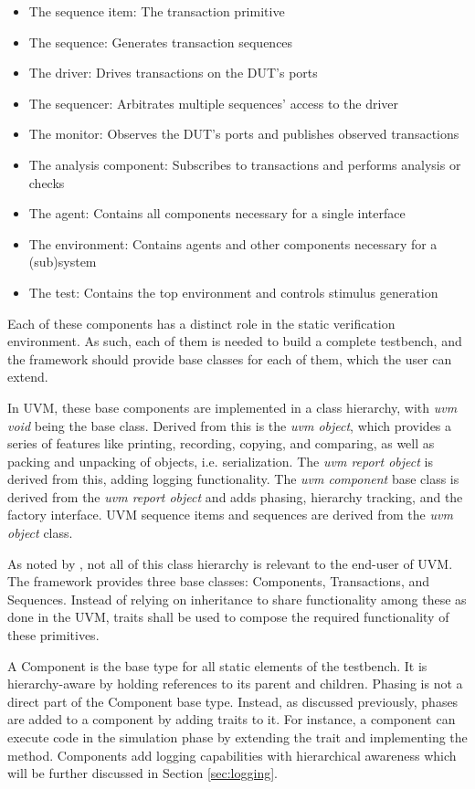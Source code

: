 \begin{itemize}
  \item The sequence item: The transaction primitive
  \item The sequence: Generates transaction sequences
  \item The driver: Drives transactions on the DUT's ports
  \item The sequencer: Arbitrates multiple sequences' access to the driver
  \item The monitor: Observes the DUT's ports and publishes observed transactions
  \item The analysis component: Subscribes to transactions and performs analysis or checks
  \item The agent: Contains all components necessary for a single interface
  \item The environment: Contains agents and other components necessary for a (sub)system
  \item The test: Contains the top environment and controls stimulus generation
\end{itemize}

Each of these components has a distinct role in the static verification environment. As such, each of them is needed to build a complete testbench, and the framework should
provide base classes for each of them, which the user can extend.

In UVM, these base components are implemented in a class hierarchy, with \textit{uvm void} being the base class. Derived
from this is the \textit{uvm object}, which provides a series of features like printing, recording, copying, and comparing,
as well as packing and unpacking of objects, i.e. serialization. The \textit{uvm report object} is derived from
this, adding logging functionality. The \textit{uvm component} base class is derived from the \textit{uvm report
object} and adds phasing, hierarchy tracking, and the factory interface. UVM sequence items and sequences are derived
from the \textit{uvm object} class.

As noted by \citeauthor{sutherland2015uvm} \cite{sutherland2015uvm}, not all of this class hierarchy is relevant to
the end-user of UVM. The framework provides three base classes: Components, Transactions, and Sequences.
Instead of relying on inheritance to share functionality among these as done in the UVM, traits shall be used
to compose the required functionality of these primitives.

A Component is the base type for all static elements of the testbench. It is hierarchy-aware by holding
references to its parent and children. Phasing is not a direct part of the Component base type. Instead, as discussed previously, phases are added to a component by adding traits to it. For instance, a component can
execute code in the simulation phase by extending the  trait and implementing the 
method. Components add logging capabilities with hierarchical awareness which will be further discussed in Section
\ref{sec:logging}.

